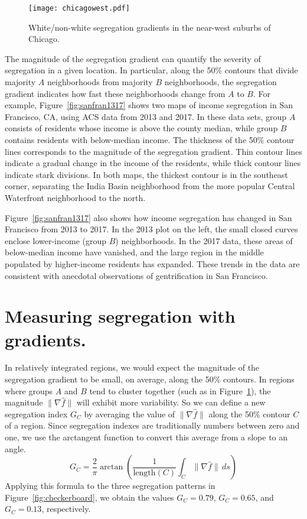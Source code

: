 \documentclass{article}
\theoremstyle{theorem}
\theoremstyle{definition}
\begin{document}
\begin{figure}
  \texttt{[image: chicagowest.pdf]}
  \caption{White/non-white segregation gradients in the near-west suburbs of Chicago.}
  \label{fig:chicagowest}
\end{figure}

The magnitude of the segregation gradient can quantify the severity of segregation in a given location. In particular, along the 50\% contours that divide majority $A$ neighborhoods from majority $B$ neighborhoods, the segregation gradient indicates how fast these neighborhoods change from $A$ to $B$. For example, Figure~\ref{fig:sanfran1317} shows two maps of income segregation in San Francisco, CA, using ACS data from 2013 and 2017. In these data sets, group $A$ consists of residents whose income is above the county median, while group $B$ contains residents with below-median income. The thickness of the 50\% contour lines corresponds to the magnitude of the segregation gradient. Thin contour lines indicate a gradual change in the income of the residents, while thick contour lines indicate stark divisions. In both maps, the thickest contour is in the southeast corner, separating the India Basin neighborhood from the more popular Central Waterfront neighborhood to the north.

Figure~\ref{fig:sanfran1317} also shows how income segregation has changed in San Francisco from 2013 to 2017. In the 2013 plot on the left, the small closed curves enclose lower-income (group $B$) neighborhoods. In the 2017 data, these areas of below-median income have vanished, and the large region in the middle populated by higher-income residents has expanded. These trends in the data are consistent with anecdotal observations of gentrification in San Francisco. \cite{pogash15}

\section{Measuring segregation with gradients.}

In relatively integrated regions, we would expect the magnitude of the segregation gradient to be small, on average, along the 50\% contours. In regions where groups $A$ and $B$ tend to cluster together (such as in Figure~\ref{fig:chicagowest}), the magnitude $\lVert \nabla \hat{f} \rVert$ will exhibit more variability. So we can define a new segregation index $G_C$ by averaging the value of  $\lVert \nabla \hat{f} \rVert$ along the 50\% contour $C$ of a region. Since segregation indexes are traditionally numbers between zero and one, we use the arctangent function to convert this average from a slope to an angle.
\begin{equation}\label{eqn:gc}
   G_C = \frac{2}{\pi} \arctan \left(\frac{1}{\mathrm{length}(C)} \int_C \lVert \nabla \hat{f} \rVert \, ds \right)
\end{equation}
Applying this formula to the three segregation patterns in Figure~\ref{fig:checkerboard}, we obtain the values $G_C=0.79$, $G_C=0.65$, and $G_C=0.13$, respectively.
\end{document}
